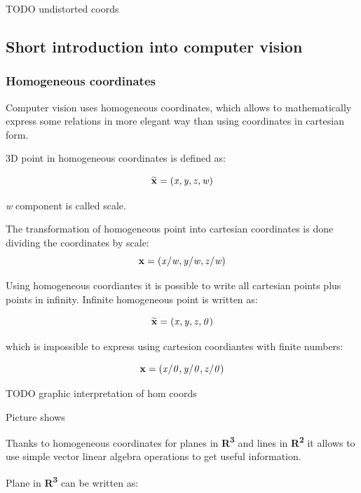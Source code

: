 \documentclass[a4paper,12pt]{article}
\newcommand{\evect}[1]{
{\bf #1}
}
\newcommand{\ehvect}[1]{
{\bf \widetilde{#1}}
}
\newcommand{\escal}[1]{
{\it #1}
}
\newcommand{\eucl}[1]{
{\bf R\textsuperscript{#1}}
}
\begin{document}
TODO undistorted coords

\subsection{Short introduction into computer vision}

\subsubsection{Homogeneous coordinates}

Computer vision uses homogeneous coordinates, which allows to mathematically express some relations
 in more elegant way than using coordinates in cartesian form. 

3D point in homogeneous coordinates is defined as:

\begin{equation}
\ehvect{x} = (\escal{x}, \escal{y}, \escal{z}, \escal{w})
\end{equation}

\escal{w} component is called scale.

The transformation of homogeneous point into cartesian coordinates is done dividing 
the coordinates by scale:
\begin{equation}
\evect{x} = (\escal{x} / \escal{w}, \escal{y} / \escal{w}, \escal{z} / \escal{w})
\end{equation}

Using homogeneous coordiantes it is possible to write all cartesian points plus points in infinity.
Infinite homogeneous point is written as: 

\begin{equation}
\ehvect{x} = (\escal{x}, \escal{y}, \escal{z}, \escal{0})
\end{equation}

which is impossible to express using cartesion coordiantes with finite numbers:

\begin{equation}
\evect{x} = (\escal{x} / \escal{0}, \escal{y} / \escal{0}, \escal{z} / \escal{0})
\end{equation}

TODO graphic interpretation of hom coords 

Picture shows 


Thanks to homogeneous coordinates for planes in \eucl{3} and lines in \eucl{2} it allows to 
use simple vector linear algebra operations 
to get useful information.

Plane in \eucl{3} can be written as:
\end{document}

